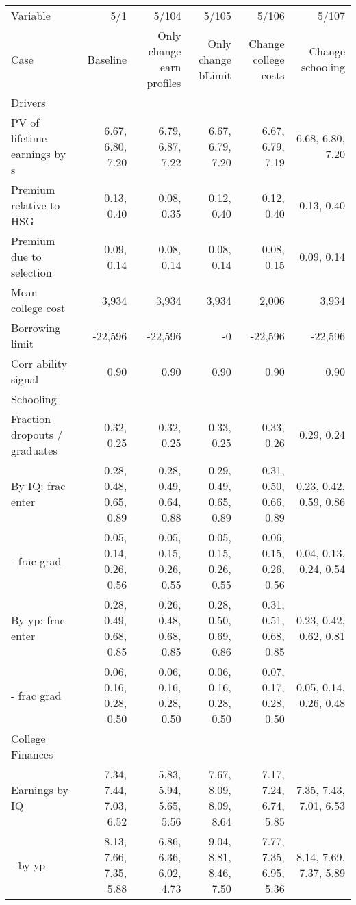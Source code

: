 \begin{tabular}{lrrrrr}
\hline
Variable & 5/1  & 5/104  & 5/105  & 5/106  & 5/107  \\ 
Case & Baseline  & Only change earn profiles  & Only change bLimit  & Change college costs  & Change schooling  \\ 
Drivers &   &   &   &   &   \\ 
PV of lifetime earnings by s & 6.67, 6.80, 7.20  & 6.79, 6.87, 7.22  & 6.67, 6.79, 7.20  & 6.67, 6.79, 7.19  & 6.68, 6.80, 7.20  \\ 
Premium relative to HSG & 0.13, 0.40  & 0.08, 0.35  & 0.12, 0.40  & 0.12, 0.40  & 0.13, 0.40  \\ 
Premium due to selection & 0.09, 0.14  & 0.08, 0.14  & 0.08, 0.14  & 0.08, 0.15  & 0.09, 0.14  \\ 
Mean college cost & 3,934  & 3,934  & 3,934  & 2,006  & 3,934  \\ 
Borrowing limit & -22,596  & -22,596  & -0  & -22,596  & -22,596  \\ 
Corr ability signal & 0.90  & 0.90  & 0.90  & 0.90  & 0.90  \\ 
\hline
Schooling &   &   &   &   &   \\ 
Fraction dropouts / graduates & 0.32, 0.25  & 0.32, 0.25  & 0.33, 0.25  & 0.33, 0.26  & 0.29, 0.24  \\ 
By IQ: frac enter & 0.28, 0.48, 0.65, 0.89  & 0.28, 0.49, 0.64, 0.88  & 0.29, 0.49, 0.65, 0.89  & 0.31, 0.50, 0.66, 0.89  & 0.23, 0.42, 0.59, 0.86  \\ 
- frac grad & 0.05, 0.14, 0.26, 0.56  & 0.05, 0.15, 0.26, 0.55  & 0.05, 0.15, 0.26, 0.55  & 0.06, 0.15, 0.26, 0.56  & 0.04, 0.13, 0.24, 0.54  \\ 
By yp: frac enter & 0.28, 0.49, 0.68, 0.85  & 0.26, 0.48, 0.68, 0.85  & 0.28, 0.50, 0.69, 0.86  & 0.31, 0.51, 0.68, 0.85  & 0.23, 0.42, 0.62, 0.81  \\ 
- frac grad & 0.06, 0.16, 0.28, 0.50  & 0.06, 0.16, 0.28, 0.50  & 0.06, 0.16, 0.28, 0.50  & 0.07, 0.17, 0.28, 0.50  & 0.05, 0.14, 0.26, 0.48  \\ 
\hline
College Finances &   &   &   &   &   \\ 
Earnings by IQ & 7.34, 7.44, 7.03, 6.52  & 5.83, 5.94, 5.65, 5.56  & 7.67, 8.09, 8.09, 8.64  & 7.17, 7.24, 6.74, 5.85  & 7.35, 7.43, 7.01, 6.53  \\ 
- by yp & 8.13, 7.66, 7.35, 5.88  & 6.86, 6.36, 6.02, 4.73  & 9.04, 8.81, 8.46, 7.50  & 7.77, 7.35, 6.95, 5.36  & 8.14, 7.69, 7.37, 5.89  \\ 

\end{tabular}
